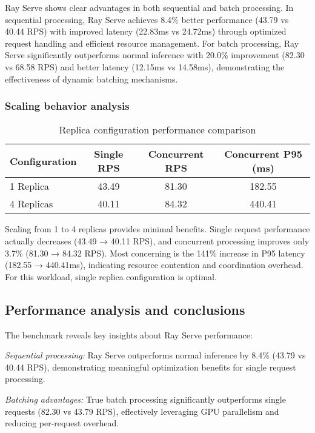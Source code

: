 Ray Serve shows clear advantages in both sequential and batch processing. In sequential processing, Ray Serve achieves 8.4\% better performance (43.79 vs 40.44 RPS) with improved latency (22.83ms vs 24.72ms) through optimized request handling and efficient resource management. For batch processing, Ray Serve significantly outperforms normal inference with 20.0\% improvement (82.30 vs 68.58 RPS) and better latency (12.15ms vs 14.58ms), demonstrating the effectiveness of dynamic batching mechanisms.

\subsubsection{Scaling behavior analysis}

\begin{table}[htbp]
\centering
\caption{Replica configuration performance comparison}
\label{tab:replica_comparison}
\begin{tabular}{|l|c|c|c|}
\hline
\textbf{Configuration} & \textbf{Single RPS} & \textbf{Concurrent RPS} & \textbf{Concurrent P95 (ms)} \\
\hline
1 Replica & 43.49 & 81.30 & 182.55 \\
4 Replicas & 40.11 & 84.32 & 440.41 \\
\hline
\end{tabular}
\end{table}

Scaling from 1 to 4 replicas provides minimal benefits. Single request performance actually decreases (43.49 → 40.11 RPS), and concurrent processing improves only 3.7\% (81.30 → 84.32 RPS). Most concerning is the 141\% increase in P95 latency (182.55 → 440.41ms), indicating resource contention and coordination overhead. For this workload, single replica configuration is optimal.

\subsection{Performance analysis and conclusions}

The benchmark reveals key insights about Ray Serve performance:

\textit{Sequential processing:} Ray Serve outperforms normal inference by 8.4\% (43.79 vs 40.44 RPS), demonstrating meaningful optimization benefits for single request processing.

\textit{Batching advantages:} True batch processing significantly outperforms single requests (82.30 vs 43.79 RPS), effectively leveraging GPU parallelism and reducing per-request overhead.

